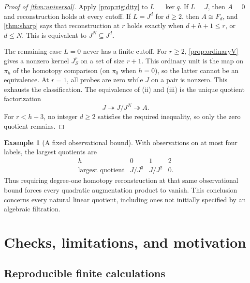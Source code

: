 \documentclass[11pt,a4paper]{article}
\theoremstyle{definition}
\newtheorem{example}[theorem]{Example}
\theoremstyle{remark}
\begin{document}
\begin{proof}[Proof of \cref{thm:universal}]
Apply \cref{prop:rigidity} to $L=\ker q$. If $L=J$, then $A=0$ and
reconstruction holds at every cutoff. If $L=J^d$ for $d\ge2$, then
$A\cong F_d$, and \cref{thm:sharp} says that reconstruction at $r$
holds exactly when $d+h+1\le r$, or $d\le N$. This is equivalent to
$J^N\subseteq J^d$.

The remaining case $L=0$ never has a finite cutoff. For $r\ge2$,
\cref{prop:ordinaryV} gives a nonzero kernel $J_S^r$ on a set of size
$r+1$. This ordinary unit is the map on $\pi_h$ of the homotopy
comparison (on $\pi_0$ when $h=0$), so the latter cannot be an
equivalence. At $r=1$, all probes are zero while $J$ on a pair is
nonzero. This exhausts the classification. The equivalence of
\textup{(ii)} and \textup{(iii)} is the unique quotient factorization
\[
 J\twoheadrightarrow J/J^N\twoheadrightarrow A.
\]
For $r<h+3$, no integer $d\ge2$ satisfies the required inequality,
so only the zero quotient remains.
\end{proof}

\begin{example}[A fixed observational bound]
With observations on at most four labels, the largest quotients are
\[
\begin{array}{c|ccc}
 h&0&1&2\\ \hline
 \text{largest quotient}&J/J^3&J/J^2&0.
\end{array}
\]
Thus requiring degree-one homotopy reconstruction at that same
observational bound forces every quadratic augmentation product to
vanish. This conclusion concerns every natural linear quotient,
including ones not initially specified by an algebraic filtration.
\end{example}

\section{Checks, limitations, and motivation}

\subsection{Reproducible finite calculations}
\end{document}
